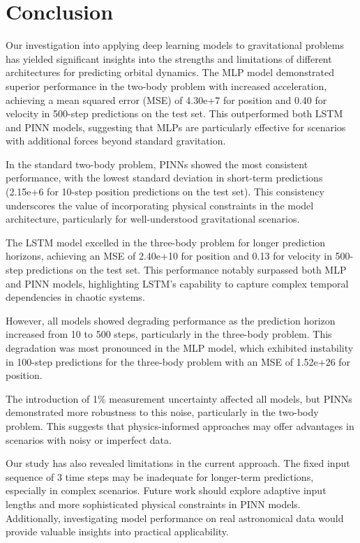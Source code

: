 \documentclass[11pt,a4paper, twocolumn]{article}
\begin{document}
\section{Conclusion}
\label{sec:conclusion}

Our investigation into applying deep learning models to gravitational problems has yielded significant insights into the strengths and limitations of different architectures for predicting orbital dynamics. The MLP model demonstrated superior performance in the two-body problem with increased acceleration, achieving a mean squared error (MSE) of 4.30e+7 for position and 0.40 for velocity in 500-step predictions on the test set. This outperformed both LSTM and PINN models, suggesting that MLPs are particularly effective for scenarios with additional forces beyond standard gravitation.

In the standard two-body problem, PINNs showed the most consistent performance, with the lowest standard deviation in short-term predictions (2.15e+6 for 10-step position predictions on the test set). This consistency underscores the value of incorporating physical constraints in the model architecture, particularly for well-understood gravitational scenarios.

The LSTM model excelled in the three-body problem for longer prediction horizons, achieving an MSE of 2.40e+10 for position and 0.13 for velocity in 500-step predictions on the test set. This performance notably surpassed both MLP and PINN models, highlighting LSTM's capability to capture complex temporal dependencies in chaotic systems.

However, all models showed degrading performance as the prediction horizon increased from 10 to 500 steps, particularly in the three-body problem. This degradation was most pronounced in the MLP model, which exhibited instability in 100-step predictions for the three-body problem with an MSE of 1.52e+26 for position.

The introduction of 1\% measurement uncertainty affected all models, but PINNs demonstrated more robustness to this noise, particularly in the two-body problem. This suggests that physics-informed approaches may offer advantages in scenarios with noisy or imperfect data.

Our study has also revealed limitations in the current approach. The fixed input sequence of 3 time steps may be inadequate for longer-term predictions, especially in complex scenarios. Future work should explore adaptive input lengths and more sophisticated physical constraints in PINN models. Additionally, investigating model performance on real astronomical data would provide valuable insights into practical applicability.
\end{document}
